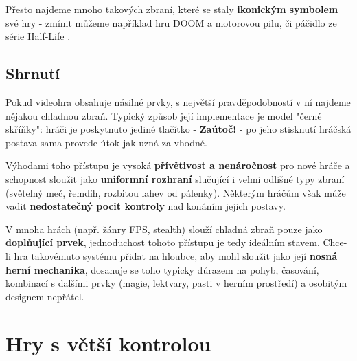Přesto najdeme mnoho takových zbraní, které se staly \textbf{ikonickým symbolem} své hry - zmínit můžeme například hru DOOM \cite{DOOM1993} a motorovou pilu, či páčidlo ze série Half-Life \cite{HalfLife}.


\subsection{Shrnutí}
Pokud videohra obsahuje násilné prvky, s největší pravděpodobností v ní najdeme nějakou chladnou zbraň. Typický způsob její implementace je model "černé skříňky": hráči je poskytnuto jediné tlačítko - \textbf{Zaútoč!} - po jeho stisknutí hráčská postava sama provede útok jak uzná za vhodné. 

Výhodami toho přístupu je vysoká \textbf{přívětivost a nenáročnost} pro nové hráče a schopnost sloužit jako \textbf{uniformní rozhraní} slučující i velmi odlišné typy zbraní (světelný meč, řemdih, rozbitou lahev od pálenky). Některým hráčům však může vadit \textbf{nedostatečný pocit kontroly} nad konáním jejich postavy.

V mnoha hrách (např. žánry \acs{FPS}, stealth) slouží chladná zbraň pouze jako \textbf{doplňující prvek}, jednoduchost tohoto přístupu je tedy ideálním stavem. Chce-li hra takovémuto systému přidat na hloubce, aby mohl sloužit jako její \textbf{nosná herní mechanika}, dosahuje se toho typicky důrazem na pohyb, časování, kombinací s dalšími prvky (magie, lektvary, pasti v herním prostředí) a osobitým designem nepřátel.




\section{Hry s větší kontrolou} \label{gamesWithMoreDirectControll}

